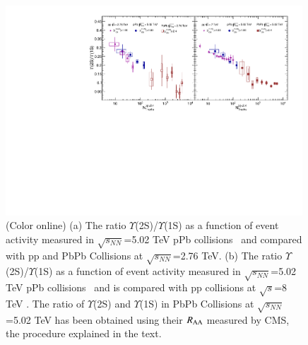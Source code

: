    




\begin{figure}
  \begin{center}
\includegraphics[width=0.99\textwidth]{Figures/ExpOverview/Fig_LHC_Y2SByY1S_NTrk.pdf}
\caption{(Color online)
  (a) The ratio $\Upsilon$(2S)/$\Upsilon$(1S) as a function of event activity measured in 
$\sqrt{s_{NN}}$=5.02 TeV pPb collisions~\cite{CMS:2013jsu} and compared with pp
and PbPb Collisions at $\sqrt{s_{NN}}$=2.76 TeV.
(b) The ratio $\Upsilon$(2S)/$\Upsilon$(1S) as a function of event activity measured in 
$\sqrt{s_{NN}}$=5.02 TeV pPb collisions~\cite{CMS:2013jsu} and is compared with pp
collisions at $\sqrt{s}$=8 TeV \cite{CMS:2020fae}.
The ratio of $\Upsilon$(2S) and $\Upsilon$(1S) in PbPb Collisions at
$\sqrt{s_{NN}}$=5.02 TeV has been obtained using their $R_{\rm AA}$ measured by CMS, 
the procedure explained in the text.
}
\label{fig:UpsilonpPb}
\end{center}
\end{figure}





